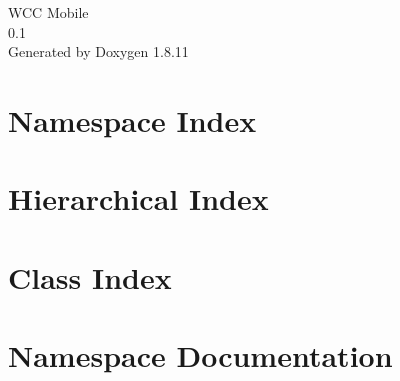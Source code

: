 \documentclass[twoside]{book}
\newcommand{\+}{\discretionary{\mbox{\scriptsize$\hookleftarrow$}}{}{}}
\newcommand{\clearemptydoublepage}{%
  \newpage{\pagestyle{empty}\cleardoublepage}%
}
\begin{document}
\hypersetup{pageanchor=false,
             bookmarksnumbered=true,
             pdfencoding=unicode
            }
\begin{titlepage}
\vspace*{7cm}
\begin{center}%
{\Large W\+CC Mobile \\[1ex]\large 0.\+1 }\\
\vspace*{1cm}
{\large Generated by Doxygen 1.8.11}\\
\end{center}
\end{titlepage}
\clearemptydoublepage
\tableofcontents
\clearemptydoublepage
{}
\hypersetup{pageanchor=true}

\chapter{Namespace Index}

\chapter{Hierarchical Index}

\chapter{Class Index}

\chapter{Namespace Documentation}




\end{document}
